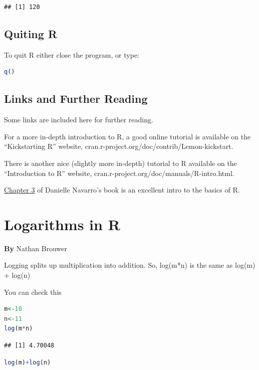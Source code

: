 \documentclass[
]{book}
\begin{document}
\begin{lstlisting}
## [1] 120
\end{lstlisting}

\hypertarget{quiting-r}{%
\section{Quiting R}\label{quiting-r}}

To quit R either close the program, or type:

\begin{lstlisting}[language=R]
q()
\end{lstlisting}

\hypertarget{links-and-further-reading}{%
\section{Links and Further Reading}\label{links-and-further-reading}}

Some links are included here for further reading.

For a more in-depth introduction to R, a good online tutorial is available on the ``Kickstarting R'' website, cran.r-project.org/doc/contrib/Lemon-kickstart.

There is another nice (slightly more in-depth) tutorial to R available on the ``Introduction to R'' website, cran.r-project.org/doc/manuals/R-intro.html.

\href{https://learningstatisticswithr.com/book/introR.html}{Chapter 3} of Danielle Navarro's book is an excellent intro to the basics of R.

\hypertarget{logarithms-in-r}{%
\chapter{Logarithms in R}\label{logarithms-in-r}}

\textbf{By} Nathan Brouwer

Logging splits up multiplication into addition. So, log(m*n) is the same as log(m) + log(n)

You can check this

\begin{lstlisting}[language=R]
m<-10
n<-11
log(m*n)
\end{lstlisting}

\begin{lstlisting}
## [1] 4.70048
\end{lstlisting}

\begin{lstlisting}[language=R]
log(m)+log(n)
\end{lstlisting}
\end{document}

